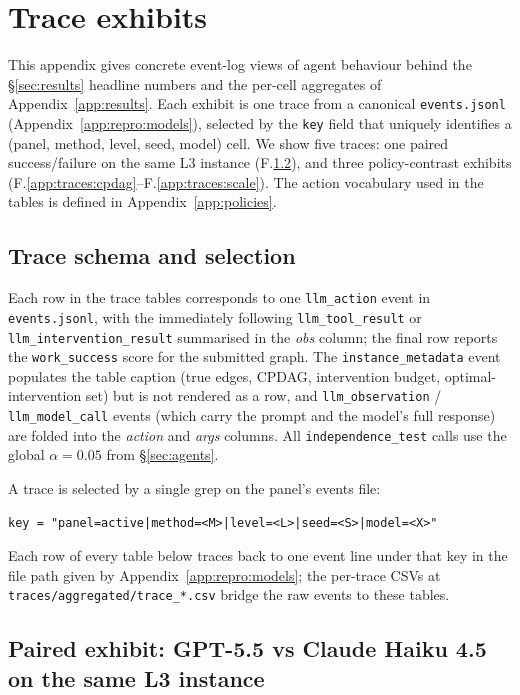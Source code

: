 \section{Trace exhibits}
\label{app:traces}

This appendix gives concrete event-log views of agent behaviour behind the §\ref{sec:results} headline numbers and the per-cell aggregates of Appendix~\ref{app:results}. Each exhibit is one trace from a canonical \texttt{events.jsonl} (Appendix~\ref{app:repro:models}), selected by the \texttt{key} field that uniquely identifies a (panel, method, level, seed, model) cell. We show five traces: one paired success/failure on the same L3 instance (F.\ref{app:traces:paired}), and three policy-contrast exhibits (F.\ref{app:traces:cpdag}--F.\ref{app:traces:scale}). The action vocabulary used in the tables is defined in Appendix~\ref{app:policies}.

\subsection{Trace schema and selection}
\label{app:traces:schema}

Each row in the trace tables corresponds to one \texttt{llm\_action} event in \texttt{events.jsonl}, with the immediately following \texttt{llm\_tool\_result} or \texttt{llm\_intervention\_result} summarised in the \emph{obs} column; the final row reports the \texttt{work\_success} score for the submitted graph. The \texttt{instance\_metadata} event populates the table caption (true edges, CPDAG, intervention budget, optimal-intervention set) but is not rendered as a row, and \texttt{llm\_observation} / \texttt{llm\_model\_call} events (which carry the prompt and the model's full response) are folded into the \emph{action} and \emph{args} columns. All \texttt{independence\_test} calls use the global $\alpha = 0.05$ from §\ref{sec:agents}.

A trace is selected by a single grep on the panel's events file:
\begin{verbatim}
key = "panel=active|method=<M>|level=<L>|seed=<S>|model=<X>"
\end{verbatim}
Each row of every table below traces back to one event line under that key in the file path given by Appendix~\ref{app:repro:models}; the per-trace CSVs at \texttt{traces/aggregated/trace\_*.csv} bridge the raw events to these tables.

\subsection{Paired exhibit: GPT-5.5 vs Claude Haiku 4.5 on the same L3 instance}
\label{app:traces:paired}

